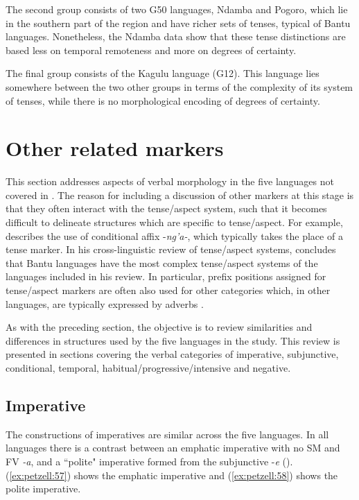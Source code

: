 \documentclass[output=paper,
            colorlinks, citecolor=brown
            ,draftmode
		  ]{langscibook}
\begin{document}
The second group consists of two G50 languages, Ndamba and Pogoro, which lie in the southern part of the region and have richer sets of tenses, typical of Bantu languages. Nonetheless, the Ndamba data show that these tense distinctions are based less on temporal remoteness and more on degrees of certainty.



The final group consists of the Kagulu language (G12). This language lies somewhere between the two other groups in terms of the complexity of its system of tenses, while there is no morphological encoding of degrees of certainty.


\section{Other related markers}\label{sec:petzell:4}

This section addresses aspects of verbal morphology in the five languages not covered in . The reason for including a discussion of other markers at this stage is that they often interact with the tense/aspect system, such that it becomes difficult to delineate structures which are specific to tense/aspect. For example,  describes the use of conditional affix -\textit{ng'a-}, which typically takes the place of a tense marker. In his cross-linguistic review of tense/aspect systems, \citet{Dahl1985} concludes that Bantu languages have the most complex tense/aspect systems of the languages included in his review. In particular, prefix positions assigned for tense/aspect markers are often also used for other categories which, in other languages, are typically expressed by adverbs \citep[176]{Dahl1985}.



As with the preceding section, the objective is to review similarities and differences in structures used by the five languages in the study. This review is presented in sections covering the verbal categories of imperative, subjunctive, conditional, temporal, habitual/progressive/intensive and negative.


\subsection{Imperative}
\label{sec:petzell:4.1}
The constructions of imperatives are similar across the five languages. In all languages there is a contrast between an emphatic imperative with no SM and FV \textit{{}-a}, and a “polite" imperative formed from the subjunctive -\textit{e} (\cites[28]{Nurse2008}[]{DevosVanOlmen2013}).  (\ref{ex:petzell:57}) shows the emphatic imperative and  (\ref{ex:petzell:58}) shows the polite imperative.
\end{document}
